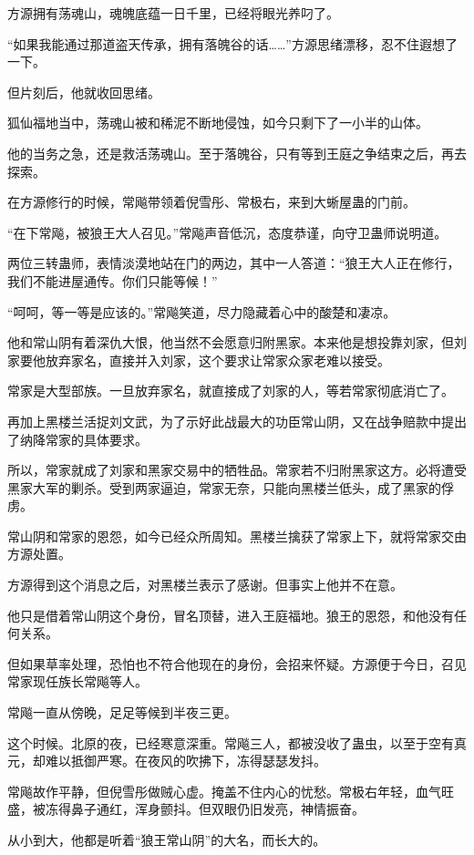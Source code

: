 \begin{this_body}
方源拥有荡魂山，魂魄底蕴一日千里，已经将眼光养叼了。

“如果我能通过那道盗天传承，拥有落魄谷的话……”方源思绪漂移，忍不住遐想了一下。

但片刻后，他就收回思绪。

狐仙福地当中，荡魂山被和稀泥不断地侵蚀，如今只剩下了一小半的山体。

他的当务之急，还是救活荡魂山。至于落魄谷，只有等到王庭之争结束之后，再去探索。

在方源修行的时候，常飚带领着倪雪彤、常极右，来到大蜥屋蛊的门前。

“在下常飚，被狼王大人召见。”常飚声音低沉，态度恭谨，向守卫蛊师说明道。

两位三转蛊师，表情淡漠地站在门的两边，其中一人答道：“狼王大人正在修行，我们不能进屋通传。你们只能等候！”

“呵呵，等一等是应该的。”常飚笑道，尽力隐藏着心中的酸楚和凄凉。

他和常山阴有着深仇大恨，他当然不会愿意归附黑家。本来他是想投靠刘家，但刘家要他放弃家名，直接并入刘家，这个要求让常家众家老难以接受。

常家是大型部族。一旦放弃家名，就直接成了刘家的人，等若常家彻底消亡了。

再加上黑楼兰活捉刘文武，为了示好此战最大的功臣常山阴，又在战争赔款中提出了纳降常家的具体要求。

所以，常家就成了刘家和黑家交易中的牺牲品。常家若不归附黑家这方。必将遭受黑家大军的剿杀。受到两家逼迫，常家无奈，只能向黑楼兰低头，成了黑家的俘虏。

常山阴和常家的恩怨，如今已经众所周知。黑楼兰擒获了常家上下，就将常家交由方源处置。

方源得到这个消息之后，对黑楼兰表示了感谢。但事实上他并不在意。

他只是借着常山阴这个身份，冒名顶替，进入王庭福地。狼王的恩怨，和他没有任何关系。

但如果草率处理，恐怕也不符合他现在的身份，会招来怀疑。方源便于今日，召见常家现任族长常飚等人。

常飚一直从傍晚，足足等候到半夜三更。

这个时候。北原的夜，已经寒意深重。常飚三人，都被没收了蛊虫，以至于空有真元，却难以抵御严寒。在夜风的吹拂下，冻得瑟瑟发抖。

常飚故作平静，但倪雪彤做贼心虚。掩盖不住内心的忧愁。常极右年轻，血气旺盛，被冻得鼻子通红，浑身颤抖。但双眼仍旧发亮，神情振奋。

从小到大，他都是听着“狼王常山阴”的大名，而长大的。


\end{this_body}
